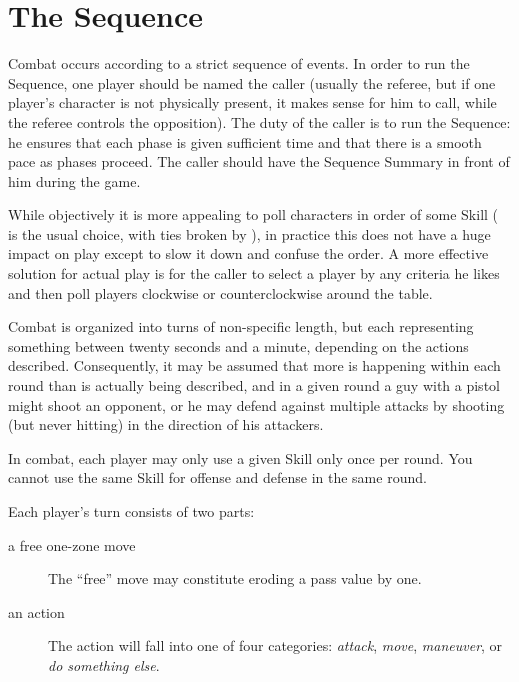 \section{The Sequence}\label{sec:personal-combat-sequence}

Combat occurs according to a strict sequence of events. In order to run the Sequence, one player should be named the caller (usually the referee, but if one player's character is not physically present, it makes sense for him to call, while the referee controls the opposition). The duty of the caller is to run the Sequence: he ensures that each phase is given sufficient time and that there is a smooth pace as phases proceed. The caller should have the Sequence Summary in front of him during the game.

While objectively it is more appealing to poll characters in order of some Skill ( is the usual choice, with ties broken by ), in practice this does not have a huge impact on play except to slow it down and confuse the order. A more effective solution for actual play is for the caller to select a player by any criteria he likes and then poll players clockwise or counterclockwise around the table.


Combat is organized into turns of non-specific length, but each representing something between twenty seconds and a minute, depending on the actions described. Consequently, it may be assumed that more is happening within each round than is actually being described, and in a given round a guy with a pistol might shoot an opponent, or he may defend against multiple attacks by shooting (but never hitting) in the direction of his attackers.

In combat, each player may only use a given Skill only once per round. You cannot use the same Skill for offense and defense in the same round.

Each player's turn consists of two parts:
\begin{description}
\item [a free one-zone move]
%
The ``free'' move may constitute eroding a pass value by one.

\item [an action] The action will fall into one of four categories: \emph{attack}, \emph{move}, \emph{maneuver}, or \emph{do something else}.
\end{description}

